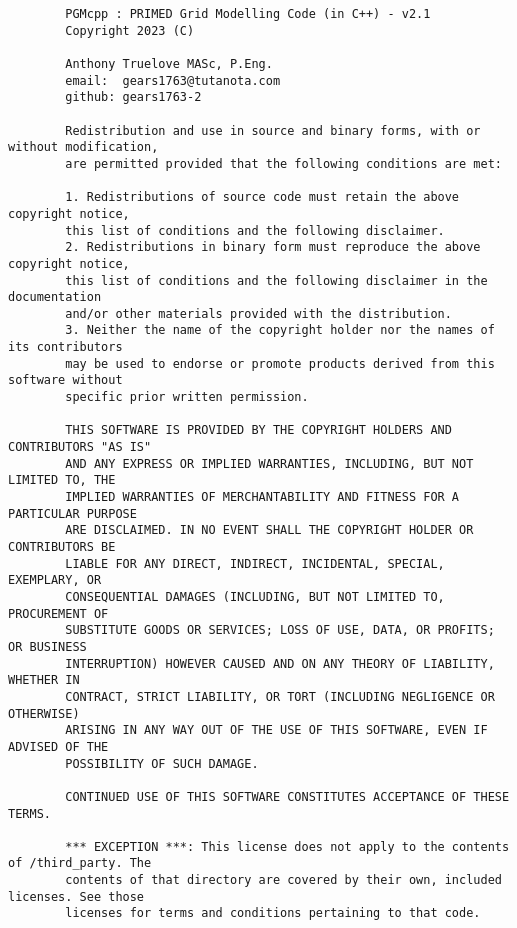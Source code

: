 \documentclass[12pt, letterpaper]{report}
\begin{document}
\begin{footnotesize}
    \begin{verbatim}
        PGMcpp : PRIMED Grid Modelling Code (in C++) - v2.1
        Copyright 2023 (C)
        
        Anthony Truelove MASc, P.Eng.
        email:  gears1763@tutanota.com
        github: gears1763-2
        
        Redistribution and use in source and binary forms, with or without modification,
        are permitted provided that the following conditions are met:
        
        1. Redistributions of source code must retain the above copyright notice,
        this list of conditions and the following disclaimer.
        2. Redistributions in binary form must reproduce the above copyright notice,
        this list of conditions and the following disclaimer in the documentation
        and/or other materials provided with the distribution.
        3. Neither the name of the copyright holder nor the names of its contributors
        may be used to endorse or promote products derived from this software without
        specific prior written permission.
        
        THIS SOFTWARE IS PROVIDED BY THE COPYRIGHT HOLDERS AND CONTRIBUTORS "AS IS"
        AND ANY EXPRESS OR IMPLIED WARRANTIES, INCLUDING, BUT NOT LIMITED TO, THE
        IMPLIED WARRANTIES OF MERCHANTABILITY AND FITNESS FOR A PARTICULAR PURPOSE
        ARE DISCLAIMED. IN NO EVENT SHALL THE COPYRIGHT HOLDER OR CONTRIBUTORS BE
        LIABLE FOR ANY DIRECT, INDIRECT, INCIDENTAL, SPECIAL, EXEMPLARY, OR
        CONSEQUENTIAL DAMAGES (INCLUDING, BUT NOT LIMITED TO, PROCUREMENT OF
        SUBSTITUTE GOODS OR SERVICES; LOSS OF USE, DATA, OR PROFITS; OR BUSINESS
        INTERRUPTION) HOWEVER CAUSED AND ON ANY THEORY OF LIABILITY, WHETHER IN
        CONTRACT, STRICT LIABILITY, OR TORT (INCLUDING NEGLIGENCE OR OTHERWISE)
        ARISING IN ANY WAY OUT OF THE USE OF THIS SOFTWARE, EVEN IF ADVISED OF THE
        POSSIBILITY OF SUCH DAMAGE.
        
        CONTINUED USE OF THIS SOFTWARE CONSTITUTES ACCEPTANCE OF THESE TERMS.
        
        *** EXCEPTION ***: This license does not apply to the contents of /third_party. The
        contents of that directory are covered by their own, included licenses. See those
        licenses for terms and conditions pertaining to that code.
    \end{verbatim}
\end{footnotesize}
\end{document}
